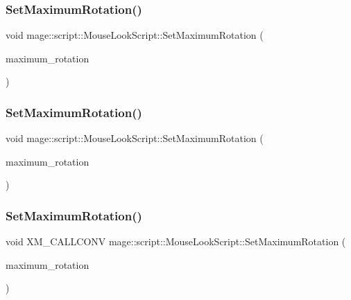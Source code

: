 \subsubsection{\texorpdfstring{Set\+Maximum\+Rotation()}{SetMaximumRotation()}\hspace{0.1cm}{\footnotesize\ttfamily [2/4]}}
{\footnotesize\ttfamily void mage\+::script\+::\+Mouse\+Look\+Script\+::\+Set\+Maximum\+Rotation (\begin{DoxyParamCaption}\item[{const X\+M\+F\+L\+O\+A\+T2 \&}]{maximum\+\_\+rotation }\end{DoxyParamCaption})\hspace{0.3cm}{\ttfamily [noexcept]}}

\hypertarget{classmage_1_1script_1_1_mouse_look_script_a1f7a65b3e6318dbc71bf09c683560242}{}\label{classmage_1_1script_1_1_mouse_look_script_a1f7a65b3e6318dbc71bf09c683560242} 
\subsubsection{\texorpdfstring{Set\+Maximum\+Rotation()}{SetMaximumRotation()}\hspace{0.1cm}{\footnotesize\ttfamily [3/4]}}
{\footnotesize\ttfamily void mage\+::script\+::\+Mouse\+Look\+Script\+::\+Set\+Maximum\+Rotation (\begin{DoxyParamCaption}\item[{X\+M\+F\+L\+O\+A\+T2 \&\&}]{maximum\+\_\+rotation }\end{DoxyParamCaption})\hspace{0.3cm}{\ttfamily [noexcept]}}

\hypertarget{classmage_1_1script_1_1_mouse_look_script_a263e143e671ef56c04132b5e58d114a9}{}\label{classmage_1_1script_1_1_mouse_look_script_a263e143e671ef56c04132b5e58d114a9} 
\subsubsection{\texorpdfstring{Set\+Maximum\+Rotation()}{SetMaximumRotation()}\hspace{0.1cm}{\footnotesize\ttfamily [4/4]}}
{\footnotesize\ttfamily void X\+M\+\_\+\+C\+A\+L\+L\+C\+O\+NV mage\+::script\+::\+Mouse\+Look\+Script\+::\+Set\+Maximum\+Rotation (\begin{DoxyParamCaption}\item[{F\+X\+M\+V\+E\+C\+T\+OR}]{maximum\+\_\+rotation }\end{DoxyParamCaption})\hspace{0.3cm}{\ttfamily [noexcept]}}

